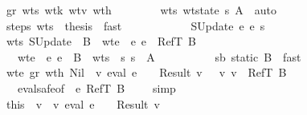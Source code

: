 \begin{isabellebody}
\ \ \ \ \ \ \isamarkupfalse \ gr{\isacharunderscore}{}\ wts{}\ wt{\isacharunderscore}k{}\ wtv{\isacharunderscore}{}\ wt{\isacharunderscore}h{}\ \isanewline
\ \ \ \ \ \ \isamarkupfalse \ wts{}{\isacharcolon}\ {\isachardoublequoteopen}wt{\isacharunderscore}state\ {\isacharquery}s{}\ A{\isachardoublequoteclose}\ \isamarkupfalse \ auto\isanewline
\ \ \ \ \ \ \isamarkupfalse \ step{\isacharunderscore}s\ wts{}\ \isamarkupfalse \ {\isacharquery}thesis\ \isamarkupfalse \ fast\isanewline
\ \ \ \ \isamarkupfalse \isanewline
\ \ \ \ \ \ \isamarkupfalse \ {\isacharparenleft}SUpdate\ e{}\ e{}\ s{\isacharprime}{\isacharparenright}\isanewline
\ \ \ \ \ \ \isamarkupfalse \ wts\ SUpdate\ \isamarkupfalse \ B\ \ wte{}{\isacharcolon}\ {\isachardoublequoteopen}{\isasymGamma}\ {\isasymturnstile}\isactrlisub e\ e{}\ {\isacharcolon}\ RefT\ B{\isachardoublequoteclose}\isanewline
\ \ \ \ \ \ \ \ \ wte{}{\isacharcolon}\ {\isachardoublequoteopen}{\isasymGamma}\ {\isasymturnstile}\isactrlisub e\ e{}\ {\isacharcolon}\ B{\isachardoublequoteclose}\ \ wts{}{\isacharcolon}\ {\isachardoublequoteopen}{\isasymGamma}\ {\isasymturnstile}\isactrlisub s\ s{\isacharprime}\ {\isacharcolon}\ A{\isacharprime}{\isachardoublequoteclose}\ \isanewline
\ \ \ \ \ \ \ \ \ sb{\isacharcolon}\ {\isachardoublequoteopen}static\ B{\isachardoublequoteclose}\ \isamarkupfalse \ fast\isanewline
\ \ \ \ \ \ \isamarkupfalse \ wte{}\ gr\ wt{\isacharunderscore}h\ Nil\ \isamarkupfalse \ {\isachardoublequoteopen}{\isacharparenleft}{\isasymexists}v{}{\isachardot}\ eval\ e{}\ {\isasymrho}\ {\isasymmu}\ {\isacharequal}\ Result\ v{}\ {\isasymand}\ {\isasymSigma}\ {\isasymturnstile}v\ v{}\ {\isacharcolon}\ RefT\ B{\isacharparenright}{\isachardoublequoteclose}\isanewline
\ \ \ \ \ \ \ \ \isamarkupfalse \ eval{\isacharunderscore}safe{\isacharbrackleft}of\ {\isasymGamma}\ e{}\ {\isachardoublequoteopen}RefT\ B{\isachardoublequoteclose}\ {\isasymSigma}\ {\isasymrho}\ {\isasymmu}{\isacharbrackright}\ \isamarkupfalse \ simp\isanewline
\ \ \ \ \ \ \isamarkupfalse \ this\ \isamarkupfalse \ v{}\ \ v{}{\isacharcolon}\ {\isachardoublequoteopen}eval\ e{}\ {\isasymrho}\ {\isasymmu}\ {\isacharequal}\ Result\ v{}{\isachardoublequoteclose}\isanewline

\end{isabellebody}
